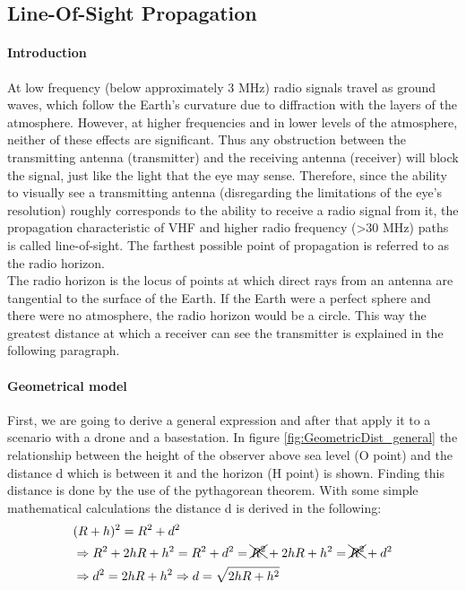 \subsection*{Line-Of-Sight Propagation}
\paragraph{Introduction}
At low frequency (below approximately 3 MHz) radio signals travel as ground waves, which follow the Earth's curvature due to diffraction with the layers of the atmosphere.
However, at higher frequencies and in lower levels of the atmosphere, neither of these effects are significant. Thus any obstruction between the transmitting antenna (transmitter) and the receiving antenna (receiver) will block the signal, just like the light that the eye may sense. Therefore, since the ability to visually see a transmitting antenna (disregarding the limitations of the eye's resolution) roughly corresponds to the ability to receive a radio signal from it, the propagation characteristic of VHF and higher radio frequency (>30 MHz) paths is called line-of-sight. The farthest possible point of propagation is referred to as the radio horizon.\\

The radio horizon is the locus of points at which direct rays from an antenna are tangential to the surface of the Earth. If the Earth were a perfect sphere and there were no atmosphere, the radio horizon would be a circle.
This way the greatest distance at which a receiver can see the transmitter is explained in the following paragraph.

\paragraph{Geometrical model}

First, we are going to derive a general expression and after that apply it to a scenario with a drone and a basestation. In figure  \ref{fig:GeometricDist_general} the relationship between the height of the observer above sea level (O point) and the distance d which is between it and the horizon (H point) is shown. Finding this distance is done by the use of the pythagorean theorem. With some simple mathematical calculations the distance d is derived in the following:
\begin{align}
&(R+h)^2 = R^2+d^2\nonumber \\
&\Rightarrow R^2+2hR+h^2 = R^2+d^2 = \xcancel{R^2}+2hR+h^2 = \xcancel{R^2}+d^2\nonumber \\
&\Rightarrow d^2 = 2hR + h^2 \Rightarrow d = \sqrt{2hR + h^2} \label{eq:los_distToHorizon}
\end{align}

